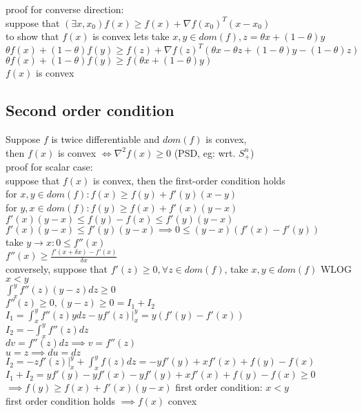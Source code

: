 \documentclass[8pt]{report}
\begin{document}
\begin{multicols*}{2}
  proof for converse direction:\\
  suppose that $(\exists x, x_0) f(x) \geq f(x) + \nabla f(x_0)^T(x-x_0)$\\
  to show that $f(x)$ is convex lets take $x,y \in dom(f), z= \theta x + (1-\theta)y$\\
  $\theta f(x) + (1-\theta) f(y) \geq f(z) + \nabla f(z)^T(\theta x - \theta z + (1-\theta)y - (1-\theta)z)$\\
  $\theta f(x) + (1-\theta) f(y) \geq f(\theta x +(1-\theta)y)$\\
  $f(x)$ is convex
  \subsection{Second order condition}
  Suppose $f$ is twice differentiable and $dom(f)$ is convex, \\
  then $f(x)$ is convex $\iff \nabla^2 f(x) \geq 0 $ (PSD, eg: wrt. $S_+^n$)\\
  
  proof for scalar case:\\
  suppose that $f(x)$ is convex, then the first-order condition holds\\
  for $x,y \in dom(f): f(x) \geq f(y) + f'(y)(x-y)$\\
  for $y,x \in dom(f): f(y) \geq f(x) + f'(x)(y-x)$\\
  $f'(x)(y-x) \leq f(y)-f(x) \leq f'(y)(y-x)$\\
  $f'(x)(y-x) \leq f'(y)(y-x) \implies 0 \leq (y-x)(f'(x)-f'(y))$\\
  take $y\to x: 0 \leq f''(x)$\\
  $f''(x) \geq \frac{f'(x+\delta x)-f'(x)}{\delta x}$\\

  conversely, suppose that $f'(z) \geq 0, \forall z \in dom(f)$, take $x,y \in dom(f)$ WLOG $x < y$\\
  $\int_x^y f''(z)(y-z) dz \geq 0$\\
  $f''(z) \geq 0, (y-z) \geq 0 = I_1+I_2$\\
  $I_1 = \int_x^y f''(z)y dz- y f'(z)|_x^y = y(f'(y)-f'(x))$\\
  $I_2 = -\int_x^y f''(z) dz$\\
  $dv=f''(z) dz \implies v = f''(z)$\\
  $u=z\implies du = dz$\\
  $I_2 = -z f'(z)|_x^y + \int_x^y f(z) dz = -y f'(y) + x f'(x)+f(y)-f(x)$\\
  $I_1+I_2=y f'(y)-y f'(x)-y f'(y) + x f'(x) + f(y)-f(x) \geq 0$\\
  $\implies f(y) \geq f(x) + f'(x)(y-x)$ first order condition: $x<y$\\
  first order condition holds $\implies f(x)$ convex\\


\end{multicols*}
\end{document}
